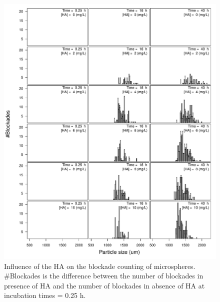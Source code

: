 \documentclass[journal=langd5,manuscript=article]{achemso}
\begin{document}
 \begin{figure}
  \includegraphics[width=\linewidth]{Figures/HA_density.pdf}
  \caption{Influence of the HA on the blockade counting of microspheres. \#Blockades is the difference between the number of blockades in presence of HA and the number of blockades in absence of HA at incubation times = 0.25 h.} 
  \label{fgr:HA_density}
\end{figure}
% 
% 
% 
\end{document}
